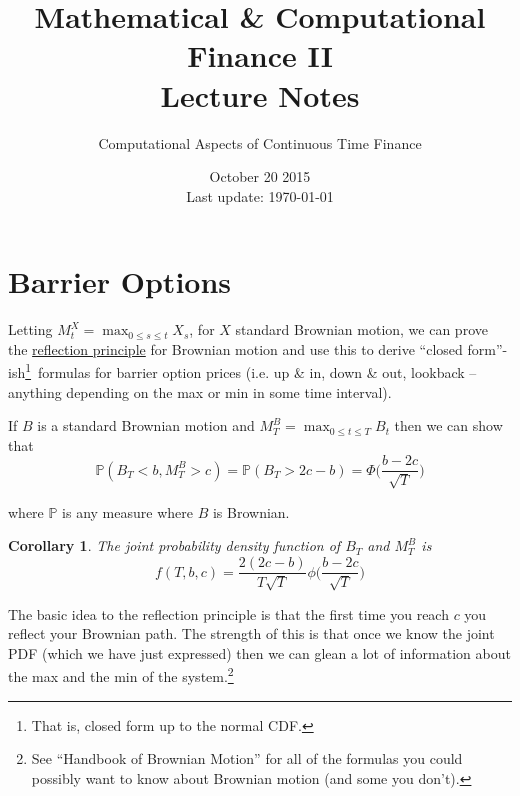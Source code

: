 \documentclass[12pt]{article}
\newenvironment{theorem}[2][Theorem:]{\begin{trivlist} %
\item[\hskip \labelsep {\bfseries #1}\hskip \labelsep {\bfseries #2.}]}{\end{trivlist}}
\newtheorem{corollary}{Corollary}
\newlength\tindent
\renewcommand{\indent}{\hspace*{\tindent}}
\begin{document}
 
 
\title{Mathematical \& Computational Finance II\\Lecture Notes}
\author{Computational Aspects of Continuous Time Finance}
\date{October 20 2015 \\ Last update: \today{}}
\maketitle

\section{Barrier Options}

\indent Letting $M^X_t = \max_{0 \leq s \leq t}X_s$, for $X$ standard Brownian motion, we can prove the \underline{reflection principle} for Brownian motion and use this to derive ``closed form''-ish\footnote{That is, closed form up to the normal CDF.}~formulas for barrier option prices (i.e. up \& in, down \& out, lookback -- anything depending on the max or min in some time interval).

\begin{theorem}{The Reflection Principle for Barrier Options} If $B$ is a standard Brownian motion and $M^B_T = \max_{0\leq t \leq T} B_t$ then we can show that
\begin{equation*}
	\mathbb P(B_T < b, M^B_T > c) = \mathbb P(B_T > 2c - b) = \Phi\bigg(\frac{b - 2c}{\sqrt{T}}\bigg)
\end{equation*}

where $\mathbb P$ is any measure where $B$ is Brownian.
\end{theorem}

\begin{corollary} The joint probability density function of $B_T$ and $M^B_T$ is 
\begin{equation*}
	f(T,b,c) = \frac{2(2c - b)}{T\sqrt{T}}\phi\bigg(\frac{b - 2c}{\sqrt{T}}\bigg)
\end{equation*}
\end{corollary}

\indent The basic idea to the reflection principle is that the first time you reach $c$ you reflect your Brownian path. The strength of this is that once we know the joint PDF (which we have just expressed) then we can glean a lot of information about the max and the min of the system.\footnote{See ``Handbook of Brownian Motion'' for all of the formulas you could possibly want to know about Brownian motion (and some you don't).}
\end{document}
